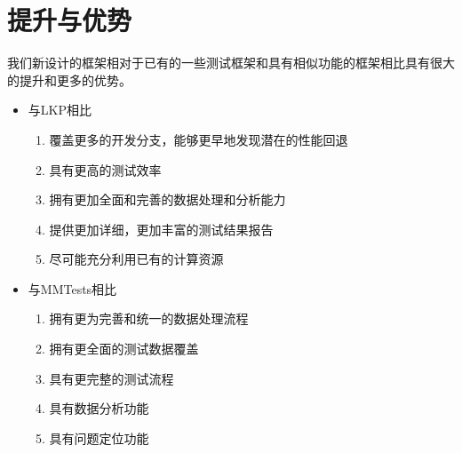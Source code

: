 \section{提升与优势}

我们新设计的框架相对于已有的一些测试框架和具有相似功能的框架相比具有很大的提升和更多的优势。

\begin{itemize}
\item 与LKP相比

\begin{enumerate}
\item 覆盖更多的开发分支，能够更早地发现潜在的性能回退
\item 具有更高的测试效率
\item 拥有更加全面和完善的数据处理和分析能力
\item 提供更加详细，更加丰富的测试结果报告
\item 尽可能充分利用已有的计算资源
\end{enumerate}

\item 与MMTests相比

\begin{enumerate}
\item 拥有更为完善和统一的数据处理流程
\item 拥有更全面的测试数据覆盖
\item 具有更完整的测试流程
\item 具有数据分析功能
\item 具有问题定位功能
\end{enumerate}

\end{itemize}